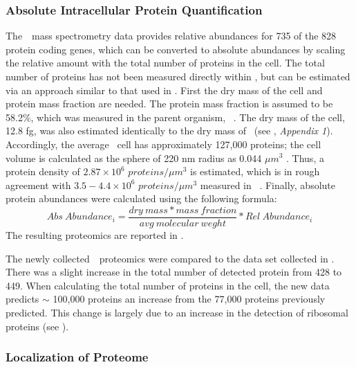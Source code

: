 \subsubsection{Absolute Intracellular Protein Quantification}
\label{sec:methods-ptn-quant}

The~\syn~mass spectrometry data provides relative abundances for 735 of the 828 protein coding genes, which can be converted to absolute abundances by scaling the relative amount with the total number of proteins in the cell. The total number of proteins has not been measured directly within \syn, but can be estimated via an approach similar to that used in \cite{breuer_essential_2019}. First the dry mass of the cell and protein mass fraction are needed. The protein mass fraction is assumed to be 58.2\%, which was measured in the parent organism, \Mmy~\citep{razin_chemical_1963}. The dry mass of the cell, 12.8 fg, was also estimated identically to the dry mass of \jsyna~(see \cite{breuer_essential_2019}, \textit{Appendix 1}). Accordingly, the average \jsyn~cell has approximately 127,000 proteins; the cell volume is calculated as the sphere of 220 nm radius as 0.044 $\mu m^3$ \cite{moger-reischer_evolution_2023}. Thus, a protein density of $2.87\times 10^{6}$ $proteins/\mu m^{3}$ is estimated, which is in rough agreement with $3.5-4.4 \times 10^{6}$ $proteins/\mu m^{3}$ measured in \eco~\citep{milo_what_2013}. Finally, absolute protein abundances were calculated using the following formula:
\begin{equation}
\label{eqn:abs-formula}
\text{$Abs~Abundance_{i} = \frac{dry~mass * mass~fraction}{avg~molecular~weght} * Rel~Abundance_{i}$}
\end{equation}
The resulting proteomics are reported in \siproteomics.

The newly collected~\syna~proteomics were compared to the data set collected in \cite{breuer_essential_2019}. There was a slight increase in the total number of detected protein from 428 \citep{breuer_essential_2019} to 449. When calculating the total number of proteins in the cell, the new data predicts $\sim$ 100,000 proteins an increase from the 77,000 proteins previously predicted. This change is largely due to an increase in the detection of ribosomal proteins (see \siproteomics).

\subsubsection{Localization of Proteome}